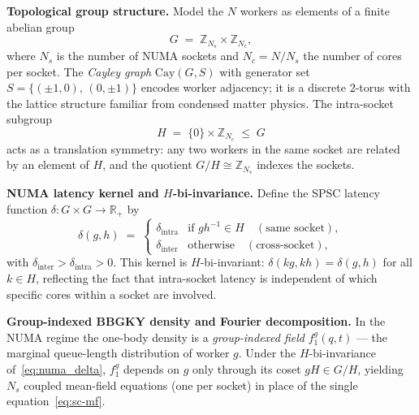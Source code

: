 \documentclass[11pt,a4paper]{article}
\begin{document}
\medskip
\noindent\textbf{Topological group structure.}
Model the $N$ workers as elements of a finite abelian group
\begin{equation}\label{eq:numa_group}
  G \;=\; \mathbb{Z}_{N_s} \times \mathbb{Z}_{N_c},
\end{equation}
where $N_s$ is the number of NUMA sockets and $N_c = N/N_s$ the number of
cores per socket.  The \emph{Cayley graph} $\mathrm{Cay}(G,S)$ with generator
set $S = \{(\pm 1, 0),\, (0, \pm 1)\}$ encodes worker adjacency; it is a
discrete $2$-torus with the lattice structure familiar from condensed matter
physics.  The intra-socket subgroup
\[
  H \;=\; \{0\} \times \mathbb{Z}_{N_c} \;\leq\; G
\]
acts as a translation symmetry: any two workers in the same socket are
related by an element of $H$, and the quotient $G/H \cong \mathbb{Z}_{N_s}$
indexes the sockets.

\medskip
\noindent\textbf{NUMA latency kernel and $H$-bi-invariance.}
Define the SPSC latency function $\delta \colon G \times G \to \mathbb{R}_{+}$
by
\begin{equation}\label{eq:numa_delta}
  \delta(g,h) \;=\;
  \begin{cases}
    \delta_{\mathrm{intra}} & \text{if } gh^{-1} \in H
                              \quad (\text{same socket}), \\
    \delta_{\mathrm{inter}} & \text{otherwise}
                              \quad (\text{cross-socket}),
  \end{cases}
\end{equation}
with $\delta_{\mathrm{inter}} > \delta_{\mathrm{intra}} > 0$.
This kernel is $H$-bi-invariant: $\delta(kg, kh) = \delta(g,h)$ for all
$k \in H$, reflecting the fact that intra-socket latency is independent of
which specific cores within a socket are involved.

\medskip
\noindent\textbf{Group-indexed BBGKY density and Fourier decomposition.}
In the NUMA regime the one-body density is a \emph{group-indexed field}
$f_1^g(q,t)$ --- the marginal queue-length distribution of worker $g$.
Under the $H$-bi-invariance of~\eqref{eq:numa_delta}, $f_1^g$ depends on
$g$ only through its coset $gH \in G/H$, yielding $N_s$ coupled mean-field
equations (one per socket) in place of the single equation~\eqref{eq:sc-mf}.
\end{document}
